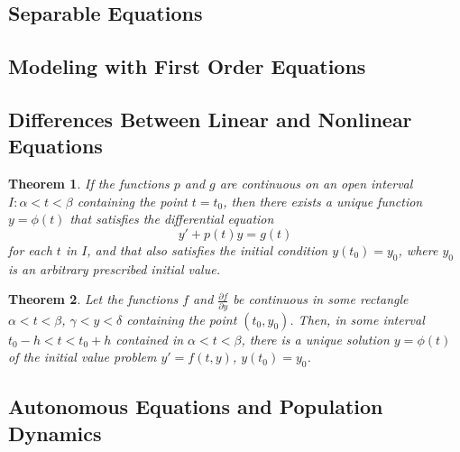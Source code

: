 \documentclass[10pt]{report}
\newtheorem{thm3}{Theorem}[subsection]
\begin{document}
\subsection{Separable Equations}
\subsection{Modeling with First Order Equations}
\subsection{Differences Between Linear and Nonlinear Equations}
\begin{thm3}
If the functions $p$ and $g$ are continuous on an open interval $I:\alpha<t<\beta$ containing the point $t=t_0$, then there exists a unique function $y=\phi(t)$ that satisfies the differential equation
$$y' + p(t)y = g(t)$$
for each $t$ in $I$, and that also satisfies the initial condition $y(t_0) = y_0$, where $y_0$ is an arbitrary prescribed initial value.
\end{thm3}
\begin{thm3}
Let the functions $f$ and $\frac{\partial f}{\partial y}$ be continuous in some rectangle $\alpha < t < \beta$, $\gamma < y < \delta$ containing the point $(t_0,y_0)$. Then, in some interval $t_0-h < t < t_0 + h$ contained in $\alpha < t < \beta$, there is a unique solution $y=\phi(t)$ of the initial value problem $y' = f(t,y)$, $y(t_0)=y_0$.
\end{thm3}
\subsection{Autonomous Equations and Population Dynamics}
\end{document}

